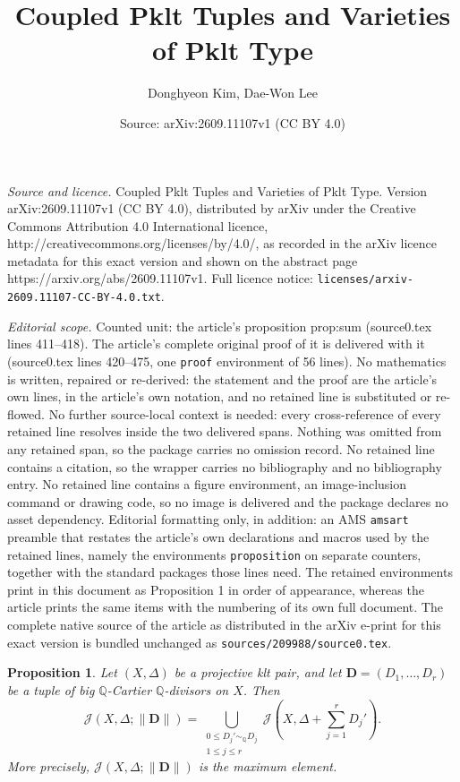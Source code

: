 \documentclass[10pt,a4paper]{amsart}
\title{Coupled Pklt Tuples and Varieties of Pklt Type}
\author{Donghyeon Kim, Dae-Won Lee}
\date{Source: arXiv:2609.11107v1 (CC BY 4.0)}
\newtheorem{proposition}{Proposition}
\begin{document}
\maketitle

\noindent\emph{Source and licence.} Coupled Pklt Tuples and Varieties of Pklt Type. Version arXiv:2609.11107v1 (CC BY 4.0), distributed by arXiv under the Creative Commons Attribution 4.0 International licence, http://creativecommons.org/licenses/by/4.0/, as recorded in the arXiv licence metadata for this exact version and shown on the abstract page https://arxiv.org/abs/2609.11107v1. Full licence notice: \texttt{licenses/arxiv-2609.11107-CC-BY-4.0.txt}.\par\smallskip

\noindent\textit{Editorial scope.} Counted unit: the article's proposition prop:sum (source0.tex lines 411--418). The article's complete original proof of it is delivered with it (source0.tex lines 420--475, one \texttt{proof} environment of 56 lines). No mathematics is written, repaired or re-derived: the statement and the proof are the article's own lines, in the article's own notation, and no retained line is substituted or re-flowed.  No further source-local context is needed: every cross-reference of every retained line resolves inside the two delivered spans.  Nothing was omitted from any retained span, so the package carries no omission record.  No retained line contains a citation, so the wrapper carries no bibliography and no bibliography entry.  No retained line contains a figure environment, an image-inclusion command or drawing code, so no image is delivered and the package declares no asset dependency.  Editorial formatting only, in addition: an AMS \texttt{amsart} preamble that restates the article's own declarations and macros used by the retained lines, namely the environments \texttt{proposition} on separate counters, together with the standard packages those lines need.  The retained environments print in this document as Proposition 1 in order of appearance, whereas the article prints the same items with the numbering of its own full document.  The complete native source of the article as distributed in the arXiv e-print for this exact version is bundled unchanged as \texttt{sources/209988/source0.tex}.
\begin{proposition}\label{prop:sum}
Let $(X,\Delta)$ be a projective klt pair, and let $\mathbf D=(D_1,\ldots,D_r)$ be a tuple of big $\mathbb Q$-Cartier $\mathbb Q$-divisors on $X$. Then
\[
\mathcal J(X,\Delta;\|\mathbf D\|)=\bigcup_{\substack{0\leq D_j'\sim_{\mathbb Q}D_j\\1\leq j\leq r}}
\mathcal J\left(X,\Delta+\sum_{j=1}^rD_j'\right).
\]
More precisely, $\mathcal J(X,\Delta;\|\mathbf D\|)$ is the maximum element.
\end{proposition}
\end{document}
